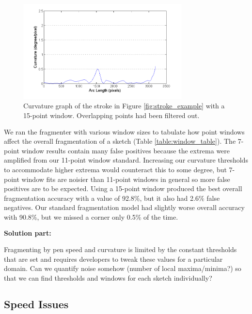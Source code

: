 \documentclass[10pt]{acmsiggraph}          %
\begin{document}
\begin{figure}[t]
  \centering
  \includegraphics[width=3.4in]{curvature_win7.png}
  \caption{Curvature graph of the stroke in Figure \ref{fig:stroke_example} with a 15-point window. Overlapping points had been filtered out.}
  \label{fig:curv_window7}
\end{figure}

We ran the fragmenter with various window sizes to tabulate how point windows affect the overall fragmentation of a sketch (Table \ref{table:window_table}). The 7-point window
results contain many false positives because the extrema were amplified from our 11-point window standard. Increasing our curvature thresholds to accommodate higher extrema would counteract this to some degree, but 7-point window fits are noisier than 11-point windows in general so more false positives are to be expected. Using a 15-point window produced the best overall fragmentation accuracy with a value of 92.8\%, but it also had 2.6\% false negatives. Our standard fragmentation model had slightly worse overall accuracy with 90.8\%, but we missed a corner only 0.5\% of the time. 


\textbf{Solution part:}

Fragmenting by pen speed and curvature is limited by the constant thresholds that are set and requires developers to tweak these values for a particular domain. Can we quantify noise somehow (number of local maxima/minima?) so that we can find thresholds and windows for each sketch individually?

\subsection{Speed Issues}
\end{document}
